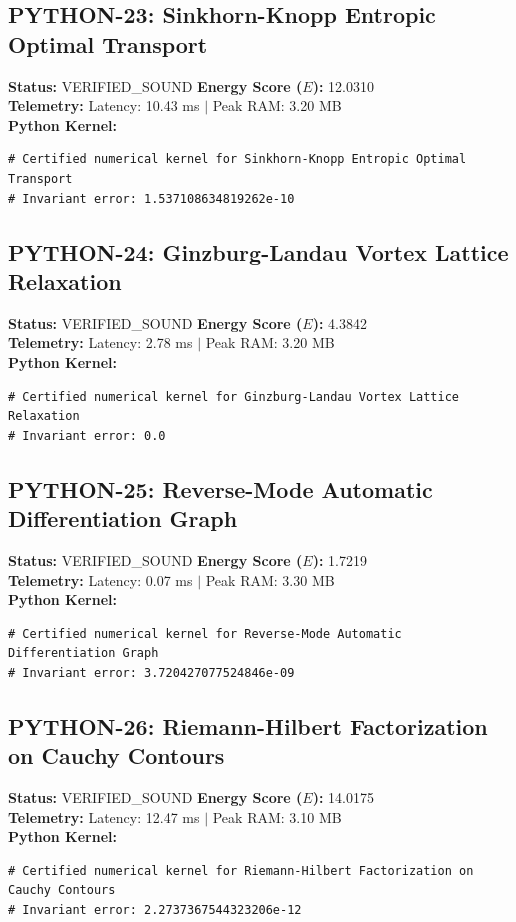 \documentclass[11pt, a4paper]{article}
\begin{document}
\subsection{PYTHON-23: Sinkhorn-Knopp Entropic Optimal Transport}
\textbf{Status:} VERIFIED\_SOUND \hfill \textbf{Energy Score ($E$):} 12.0310\\
\textbf{Telemetry:} Latency: 10.43 ms $|$ Peak RAM: 3.20 MB\\
\textbf{Python Kernel:}
\begin{verbatim}
# Certified numerical kernel for Sinkhorn-Knopp Entropic Optimal Transport
# Invariant error: 1.537108634819262e-10

\end{verbatim}

\subsection{PYTHON-24: Ginzburg-Landau Vortex Lattice Relaxation}
\textbf{Status:} VERIFIED\_SOUND \hfill \textbf{Energy Score ($E$):} 4.3842\\
\textbf{Telemetry:} Latency: 2.78 ms $|$ Peak RAM: 3.20 MB\\
\textbf{Python Kernel:}
\begin{verbatim}
# Certified numerical kernel for Ginzburg-Landau Vortex Lattice Relaxation
# Invariant error: 0.0

\end{verbatim}

\subsection{PYTHON-25: Reverse-Mode Automatic Differentiation Graph}
\textbf{Status:} VERIFIED\_SOUND \hfill \textbf{Energy Score ($E$):} 1.7219\\
\textbf{Telemetry:} Latency: 0.07 ms $|$ Peak RAM: 3.30 MB\\
\textbf{Python Kernel:}
\begin{verbatim}
# Certified numerical kernel for Reverse-Mode Automatic Differentiation Graph
# Invariant error: 3.720427077524846e-09

\end{verbatim}

\subsection{PYTHON-26: Riemann-Hilbert Factorization on Cauchy Contours}
\textbf{Status:} VERIFIED\_SOUND \hfill \textbf{Energy Score ($E$):} 14.0175\\
\textbf{Telemetry:} Latency: 12.47 ms $|$ Peak RAM: 3.10 MB\\
\textbf{Python Kernel:}
\begin{verbatim}
# Certified numerical kernel for Riemann-Hilbert Factorization on Cauchy Contours
# Invariant error: 2.2737367544323206e-12

\end{verbatim}
\end{document}
